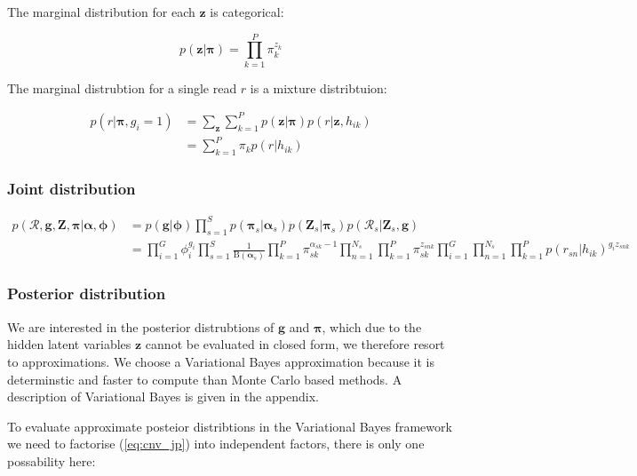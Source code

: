 \documentclass{article}
\begin{document}
The marginal distribution for each $\boldsymbol{z}$ is categorical:

\begin{equation}
\label{eq:cnv_z_marginal}
    p(\boldsymbol{z} | \boldsymbol{\pi}) = \prod_{k = 1}^P \pi_k^{z_k}
\end{equation}

The marginal distrubtion for a single read $r$ is a mixture distribtuion:

\begin{align}
\label{eq:cnv_read_marginal}
 p(r | \boldsymbol{\pi}, g_i = 1) &= \sum_{\boldsymbol{z}} \sum^P_{k = 1} p(\boldsymbol{z} | \boldsymbol{\pi}) p(r | \boldsymbol{z}, h_{ik}) \\
 &= \sum^P_{k = 1} \pi_k p(r | h_{ik})
\end{align}

\subsubsection{Joint distribution}

\begin{align}
\label{eq:cnv_jp}
 p(\mathcal{R}, \boldsymbol{g}, \boldsymbol{Z}, \boldsymbol{\pi} | \boldsymbol{\alpha}, \boldsymbol{\phi}) &= p(\boldsymbol{g} | \boldsymbol{\phi}) \prod_{s = 1}^S p(\boldsymbol{\pi}_s | \boldsymbol{\alpha}_s) p(\boldsymbol{Z}_s | \boldsymbol{\pi}_s) p(\mathcal{R}_s | \boldsymbol{Z}_s, \boldsymbol{g}) \\
 &= \prod^G_{i = 1} \phi_i^{g_i} \prod_{s = 1}^S \frac{1}{\text{B}(\boldsymbol{\alpha}_s)} \prod_{k = 1}^P \pi_{sk}^{\alpha_{sk} - 1} \prod_{n = 1}^{N_s} \prod_{k = 1}^P \pi_{sk}^{z_{snk}} \prod^G_{i = 1} \prod_{n = 1}^{N_s} \prod_{k = 1}^P p(r_{sn} | h_{ik})^{g_i z_{snk}}
\end{align}

\subsubsection{Posterior distribution}

We are interested in the posterior distrubtions of $\boldsymbol{g}$ and $\boldsymbol{\pi}$, which due to the hidden latent variables $\boldsymbol{z}$ cannot be evaluated in closed form, we therefore resort to approximations. We choose a Variational Bayes approximation because it is determinstic and faster to compute than Monte Carlo based methods. A description of Variational Bayes is given in the appendix.

To evaluate approximate posteior distribtions in the Variational Bayes framework we need to factorise (\ref{eq:cnv_jp}) into independent factors, there is only one possability here:
\end{document}

